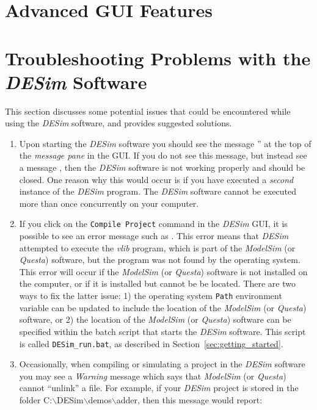 {\section{Advanced GUI Features}
\label{sec:advanced}

\newpage
\section{Troubleshooting Problems with the {\it DESim} Software}
\label{sec:trouble}

This section discusses some potential issues that could be encountered while using the
{\it DESim} software, and provides suggested solutions.

\begin{enumerate}
\item Upon starting the {\it DESim} software you should see the message 
'' at the top of the {\it message pane} in the GUI. If you do 
not see this message, but instead see a message , then 
the {\it DESim} software is not working properly and should be closed. One
reason why this would occur is if you have executed a {\it second}
instance of the {\it DESim} program. The {\it DESim} software cannot be
executed more than once concurrently on your computer. 

\item If you click on the \texttt{Compile Project} command in the {\it DESim} GUI, it is
possible to see an error message such as 
. This error means that
{\it DESim} attempted to execute the {\it vlib} program, which is part of the 
{\it ModelSim} (or {\it Questa}) software, but the program was not found by the
operating system. This error will occur if the {\it ModelSim} (or {\it Questa}) software 
is not installed on the computer, or if it is installed but cannot be be located. There are 
two ways to fix the latter issue: 1) the operating system \texttt{Path} environment variable 
can be updated to include the location of the {\it ModelSim} (or {\it Questa}) software, 
or 2) the location of the {\it ModelSim} (or {\it Questa}) software can be specified within 
the batch script that starts the {\it DESim} software. This script is called 
\texttt{DESim\_run.bat}, as described in Section~\ref{sec:getting_started}.

\item Occasionally, when compiling or simulating a project in the {\it DESim} software you may
see a {\it Warning} message which says that {\it ModelSim} (or {\it Questa}) cannot 
``unlink'' a file.  For example, if your {\it DESim} project is stored in the folder
C:$\backslash$DESim$\backslash$demos$\backslash$adder, then this message would report: 


\end{enumerate}}
